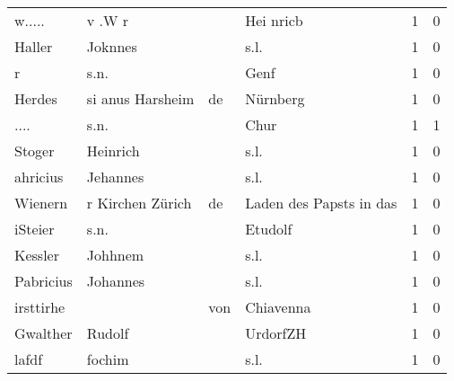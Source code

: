 \begin{center}
\begin{tiny}
\begin{longtabu}{llllrr}
                   w..... &                             v .W r &             &                                   Hei nricb &          1 &         0 \\
                   Haller &                            Joknnes &             &                                        s.l. &          1 &         0 \\
                        r &                               s.n. &             &                                        Genf &          1 &         0 \\
                   Herdes &                   si anus Harsheim &          de &                                    Nürnberg &          1 &         0 \\
                     .... &                               s.n. &             &                                        Chur &          1 &         1 \\
                   Stoger &                           Heinrich &             &                                        s.l. &          1 &         0 \\
                 ahricius &                           Jehannes &             &                                        s.l. &          1 &         0 \\
                  Wienern &                   r Kirchen Zürich &          de &                     Laden des Papsts in das &          1 &         0 \\
                  iSteier &                               s.n. &             &                                     Etudolf &          1 &         0 \\
                  Kessler &                            Johhnem &             &                                        s.l. &          1 &         0 \\
                Pabricius &                           Johannes &             &                                        s.l. &          1 &         0 \\
                irsttirhe &                                    &         von &                                   Chiavenna &          1 &         0 \\
                 Gwalther &                             Rudolf &             &                                    UrdorfZH &          1 &         0 \\
                    lafdf &                             fochim &             &                                        s.l. &          1 &         0 \\

\end{longtabu}
\end{tiny}
\end{center}
